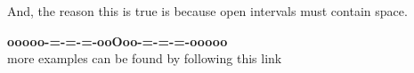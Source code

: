 \documentclass{ximera}
\begin{document}
And, the reason this is true is because open intervals must contain space.



































































\begin{center}
\textbf{\textcolor{green!50!black}{ooooo-=-=-=-ooOoo-=-=-=-ooooo}} \\

more examples can be found by following this link\\ 

\end{center}
\end{document}
